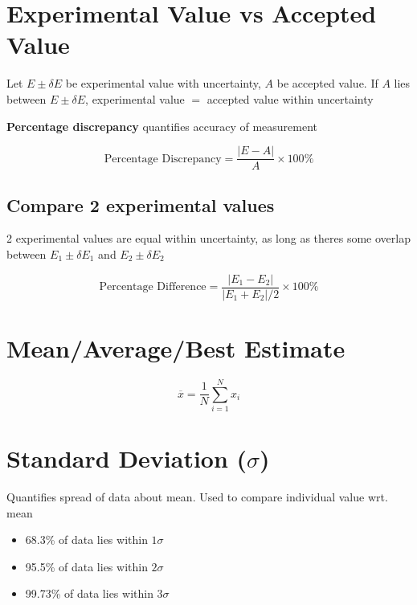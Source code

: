 \documentclass[12pt]{article}
\newcommand{\hilight}[1]{\colorbox{Dandelion}{#1}}
\begin{document}
\section{Experimental Value vs Accepted Value}

Let $E \pm \delta E$ be experimental value with uncertainty, $A$ be accepted value. If $A$ lies between $E \pm \delta E$, experimental value $=$ accepted value within uncertainty

\vspace{0.5cm}

{\bf Percentage discrepancy} quantifies accuracy of measurement 

\vspace{0.5cm}

\begin{mdframed}
	$$\textrm{Percentage Discrepancy} = \frac{|E-A|}{A} \times 100\%$$
\end{mdframed} 

\subsection{Compare 2 experimental values}

2 experimental values are equal within uncertainty, as long as theres some overlap between $E_1 \pm \delta E_1$ and $E_2 \pm \delta E_2$

$$\textrm{Percentage Difference} = \frac{|E_1 - E_2|}{|E_1 + E_2|/2} \times 100\%$$

\section{Mean/Average/Best Estimate}

\begin{mdframed}
	$$\overline{x} = \frac{1}{N} \sum_{i=1}^{N} x_i$$
\end{mdframed}

\section{Standard Deviation ($\sigma$)}

Quantifies \hilight{spread of data about mean}. Used to compare \hilight{individual value} wrt. \hilight{mean}

\begin{itemize}
	\item 68.3\% of data lies within $1 \sigma$
	\item 95.5\% of data lies within $2 \sigma$
	\item 99.73\% of data lies within $3 \sigma$
\end{itemize}
\end{document}
